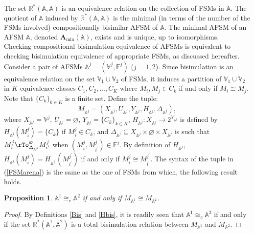 \documentclass{amsart}
\newtheorem{proposition}[theorem]{Proposition}
\theoremstyle{definition}
\theoremstyle{remark}
\numberwithin{equation}{section}
\begin{document}
The set $\mathbb{R}^{\ast}(\mathbb{A},\mathbb{A})$ is an equivalence relation on the collection of FSMs in $\mathbb{A}$. 
The quotient
of $\mathbb{A}$ induced by $\mathbb{R}^{\ast}(\mathbb{A},\mathbb{A})$ is the minimal (in terms of the number of the FSMs involved) compositionally bisimilar AFSM of $\mathbb{A}$. The minimal AFSM of an AFSM $\mathbb{A}$, denoted $\mathbf{A}_{\min}(\mathbb{A})$, exists and is unique, up to isomorphisms. \\
Checking compositional bisimulation equivalence of AFSMs is equivalent to checking bisimulation equivalence of appropriate FSMs, as discussed hereafter. Consider a pair of AFSMs $\mathbb{A}^{j}=(\mathbb{V}^{j},\mathbb{E}^{j})$ ($j=1,2$). 
Since bisimulation is an equivalence relation on the set $\mathbb{V}_{1}\cup\mathbb{V}_{2}$ of FSMs, it induces a partition of $\mathbb{V}_{1}\cup\mathbb{V}_{2}$ in $K$ equivalence classes $C_{1},C_{2},...,C_{K}$ where $M_{i},M_{j}\in C_{k}$ if and only if $M_{i} \cong M_{j}$. Note that $\{C_{k}\}_{k\in K}$ is a finite set. Define the tuple: 
\begin{equation}
\label{FSMarena}
M_{\mathbb{A}^{j}}=(X_{\mathbb{A}^{j}},U_{\mathbb{A}^{j}},Y_{\mathbb{A}^{j}},H_{\mathbb{A}^{j}},\Delta_{\mathbb{A}^{j}}),
\end{equation}
where $X_{\mathbb{A}^{j}}=\mathbb{V}^{j}$, $U_{\mathbb{A}^{j}}=\varnothing$, $Y_{\mathbb{A}^{j}}=\{C_{k}\}_{k\in K}$, $H_{\mathbb{A}^{j}}:X_{\mathbb{A}^{j}}\rightarrow 2^{Y_{\mathbb{A}^{j}}}$ is defined by $H_{\mathbb{A}^{j}}(M_{i}^{j})=\{C_k\}$ if $M_{i}^{j}\in C_{k}$, and $\Delta_{\mathbb{A}^{j}}\subseteq X_{\mathbb{A}^{j}} \times \varnothing \times X_{\mathbb{A}^{j}}$ is such that 
$M_{i}^{j} \rTo_{\Delta_{\mathbb{A}^{j}}}^{\varnothing} M_{i^{\prime}}^{j}$ when $(M_{i}^{j},M_{i^{\prime}}^{j})\in\mathbb{E}^{j}$. By definition of $H_{\mathbb{A}^{j}}$, $H_{\mathbb{A}^{j}}(M_{i}^{j})=H_{\mathbb{A}^{j^{\prime}}}(M_{i^{\prime}}^{j^{\prime}})$ if and only if $M_{i}^{j} \cong M_{i^{\prime}}^{j^{\prime}}$.
The syntax of the tuple in (\ref{FSMarena}) is the same as the one of FSMs from which, the following result holds.
\begin{proposition}
\label{gio}
$\mathbb{A}^{1} \cong_{c} \mathbb{A}^{2}$ if and only if $M_{\mathbb{A}^{1}} \cong M_{\mathbb{A}^{2}}$. 
\end{proposition}

\begin{proof}
By Definitions \ref{Bis} and \ref{Hbis}, it is readily seen that $\mathbb{A}^{1} \cong_{c} \mathbb{A}^{2}$ if and only if the set 
$\mathbb{R}^{\ast}(\mathbb{A}^{1},\mathbb{A}^{2})$ is a total bisimulation relation between $M_{\mathbb{A}^{1}}$ and $M_{\mathbb{A}^{2}}$. 
\end{proof}
\end{document}
